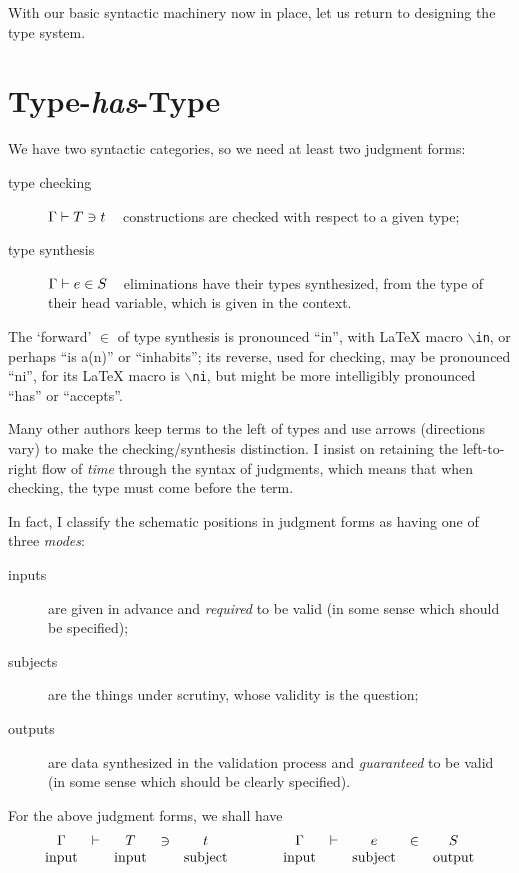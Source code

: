 \documentclass[natbib]{article}
\begin{document}
With our basic syntactic machinery now in place, let us
return to designing the type system.



\section{Type-\emph{has}-Type}

We have two syntactic categories, so we need at least two judgment forms:
\begin{description}
\item[type checking] $\Gamma \vdash T \ni t$ ~ constructions are checked with respect to a given type;
\item[type synthesis] $\Gamma \vdash e \in S$ ~ eliminations have their types synthesized, from the type of their head variable, which is given in the context.
\end{description}
The `forward' $\in$ of type synthesis is pronounced ``in'', with \LaTeX{} macro {\tt $\backslash$in}, or perhaps ``is a(n)'' or ``inhabits''; its reverse, used for checking, may be pronounced ``ni'', for its \LaTeX{} macro is {\tt $\backslash$ni}, but
might be more intelligibly pronounced ``has'' or ``accepts''.

Many other authors keep terms to the left of types and use arrows (directions vary) to make the checking/synthesis distinction. I insist on retaining the left-to-right flow of \emph{time} through the
syntax of judgments, which means that when checking, the type must come before the term.

In fact, I classify the schematic positions in judgment forms as having one of three \emph{modes}:
\begin{description}
\item[inputs] are given in advance and \emph{required} to be valid (in some sense which should be specified);
\item[subjects] are the things under scrutiny, whose validity is the question;
\item[outputs] are data synthesized in the validation process and \emph{guaranteed} to be valid
  (in some sense which should be clearly specified).
\end{description}

For the above judgment forms, we shall have
\[\begin{array}{ccccc@{\qquad\qquad}ccccc}
\CHK{\Gamma&}{&T&}{&t} & \SYN{\Gamma&}{&e&}{&S}\\
\mbox{input} && \mbox{input} && \mbox{subject} &
\mbox{input} && \mbox{subject} && \mbox{output}
\end{array}\]
\end{document}
